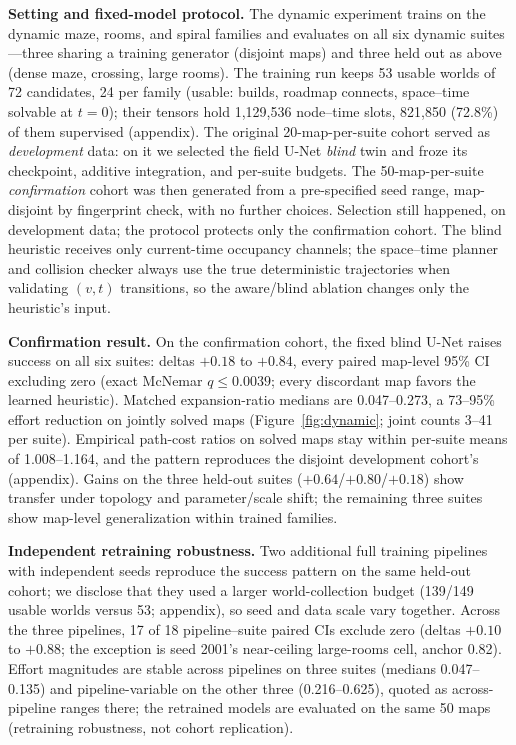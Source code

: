 \documentclass[letterpaper]{article} %
\begin{document}
\textbf{Setting and fixed-model protocol.} The dynamic experiment trains on the dynamic maze, rooms, and spiral families and evaluates on all six dynamic suites---three sharing a training generator (disjoint maps) and three held out as above (dense maze, crossing, large rooms). The training run keeps 53 usable worlds of 72 candidates, 24 per family (usable: builds, roadmap connects, space--time solvable at $t{=}0$); their tensors hold 1{,}129{,}536 node--time slots, 821{,}850 (72.8\%) of them supervised (appendix). The original 20-map-per-suite cohort served as \emph{development} data: on it we selected the field U-Net \emph{blind} twin and froze its checkpoint, additive integration, and per-suite budgets. The 50-map-per-suite \emph{confirmation} cohort was then generated from a pre-specified seed range, map-disjoint by fingerprint check, with no further choices. Selection still happened, on development data; the protocol protects only the confirmation cohort. The blind heuristic receives only current-time occupancy channels; the space--time planner and collision checker always use the true deterministic trajectories when validating $(v,t)$ transitions, so the aware/blind ablation changes only the heuristic's input.

\textbf{Confirmation result.} On the confirmation cohort, the fixed blind U-Net raises success on all six suites: deltas $+0.18$ to $+0.84$, every paired map-level 95\% CI excluding zero (exact McNemar $q \leq 0.0039$; every discordant map favors the learned heuristic). Matched expansion-ratio medians are 0.047--0.273, a 73--95\% effort reduction on jointly solved maps (Figure~\ref{fig:dynamic}; joint counts 3--41 per suite). Empirical path-cost ratios on solved maps stay within per-suite means of 1.008--1.164, and the pattern reproduces the disjoint development cohort's (appendix). Gains on the three held-out suites ($+0.64$/$+0.80$/$+0.18$) show transfer under topology and parameter/scale shift; the remaining three suites show map-level generalization within trained families.

\textbf{Independent retraining robustness.} Two additional full training pipelines with independent seeds reproduce the success pattern on the same held-out cohort; we disclose that they used a larger world-collection budget (139/149 usable worlds versus 53; appendix), so seed and data scale vary together. Across the three pipelines, 17 of 18 pipeline--suite paired CIs exclude zero (deltas $+0.10$ to $+0.88$; the exception is seed 2001's near-ceiling large-rooms cell, anchor 0.82). Effort magnitudes are stable across pipelines on three suites (medians 0.047--0.135) and pipeline-variable on the other three (0.216--0.625), quoted as across-pipeline ranges there; the retrained models are evaluated on the same 50 maps (retraining robustness, not cohort replication).
\end{document}
